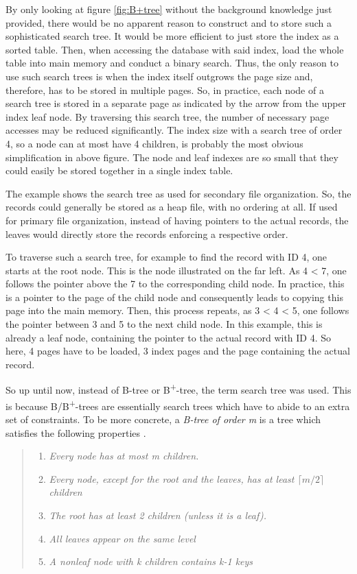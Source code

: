 By only looking at figure \ref{fig:B+tree} without the background knowledge just provided, there would be no apparent reason to construct and to store such a sophisticated search tree. It would be more efficient to just store the index as a sorted table. Then, when accessing the database with said index, load the whole table into main memory and conduct a binary search. Thus, the only reason to use such search trees is when the index itself outgrows the page size and, therefore, has to be stored in multiple pages. So, in practice, each node of a search tree is stored in a separate page as indicated by the arrow from the upper index leaf node. By traversing this search tree, the number of necessary page accesses may be reduced significantly. The index size with a search tree of order 4, so a node can at most have 4 children, is probably the most obvious simplification in above figure. The node and leaf indexes are so small that they could easily be stored together in a single index table.\par 
The example shows the search tree as used for secondary file organization. So, the records could generally be stored as a heap file, with no ordering at all. If used for primary file organization, instead of having pointers to the actual records, the leaves would directly store the records enforcing a respective order.\par
To traverse such a search tree, for example to find the record with ID 4, one starts at the root node. This is the node illustrated on the far left. As 4 < 7, one follows the pointer above the 7 to the corresponding child node. In practice, this is a pointer to the page of the child node and consequently leads to copying this page into the main memory. Then, this process repeats, as 3 < 4 < 5, one follows the pointer between 3 and 5 to the next child node. In this example, this is already a leaf node, containing the pointer to the actual record with ID 4. So here, 4 pages have to be loaded, 3 index pages and the page containing the actual record.\par
So up until now, instead of B-tree or B\textsuperscript{+}-tree, the term search tree was used. This is because B/B\textsuperscript{+}-trees are essentially search trees which have to abide to an extra set of constraints. To be more concrete, a \emph{B-tree of order m} is a tree which satisfies the following properties \cite{SortingSearchingBible}.

\begin{quote}
	\begin{enumerate}
		\item\textit{Every node has at most m children. }
		\item\textit{Every node, except for the root and the leaves, has at least $\lceil m/2 \rceil$ children}
		\item\textit{The root has at least 2 children (unless it is a leaf).}
		\item\textit{All leaves appear on the same level}
		\item\textit{A nonleaf node with k children contains k-1 keys}
	\end{enumerate}
\end{quote}


